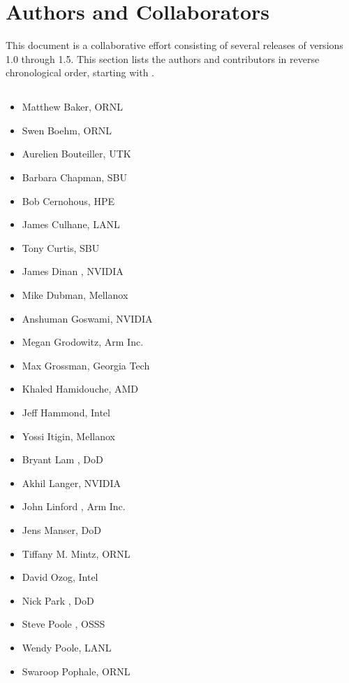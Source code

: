 \section*{Authors and Collaborators}
This document is a collaborative effort consisting of several releases of \openshmem versions 1.0 through 1.5. This section lists the authors and contributors in reverse chronological order, starting with .


\subsection*{}
\begin{multicols}{2}
\begin{itemize}
\setlength\itemsep{0.1em}
\item Matthew Baker, \ac{ORNL}
\item Swen Boehm, \ac{ORNL}
\item Aurelien Bouteiller, \ac{UTK}
\item Barbara Chapman, \ac{SBU}
\item Bob Cernohous, \ac{HPE}
\item James Culhane, \ac{LANL}
\item Tony Curtis, \ac{SBU}
\item James Dinan \footnotemark[3] \footnotemark[4], NVIDIA
\item Mike Dubman, Mellanox
\item Anshuman Goswami, NVIDIA
\item Megan Grodowitz, Arm Inc.
\item Max Grossman, Georgia Tech
\item Khaled Hamidouche, \ac{AMD}
\item Jeff Hammond, Intel
\item Yossi Itigin, Mellanox
\item Bryant Lam \footnotemark[5], \ac{DoD}
\item Akhil Langer, NVIDIA
\item John Linford \footnotemark[6], Arm Inc.
\item Jens Manser, \ac{DoD}
\item Tiffany M. Mintz, \ac{ORNL}
\item David Ozog, Intel
\item Nick Park \footnotemark[7], \ac{DoD}
\item Steve Poole \footnotemark[1], \ac{OSSS}
\item Wendy Poole, \ac{LANL}
\item Swaroop Pophale, \ac{ORNL}

\end{itemize}
\end{multicols}
